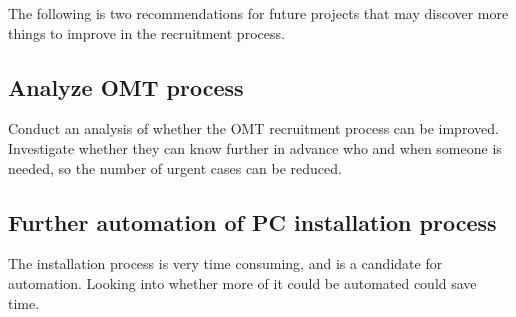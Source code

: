 The following is two recommendations for future projects that may discover more things to improve in the recruitment process.

\subsection{Analyze OMT process}
Conduct an analysis of whether the OMT recruitment process can be improved.
Investigate whether they can know further in advance who and when someone is needed, so the number of urgent cases can be reduced.

\subsection{Further automation of PC installation process}
The installation process is very time consuming, and is a candidate for automation.
Looking into whether more of it could be automated could save time.
